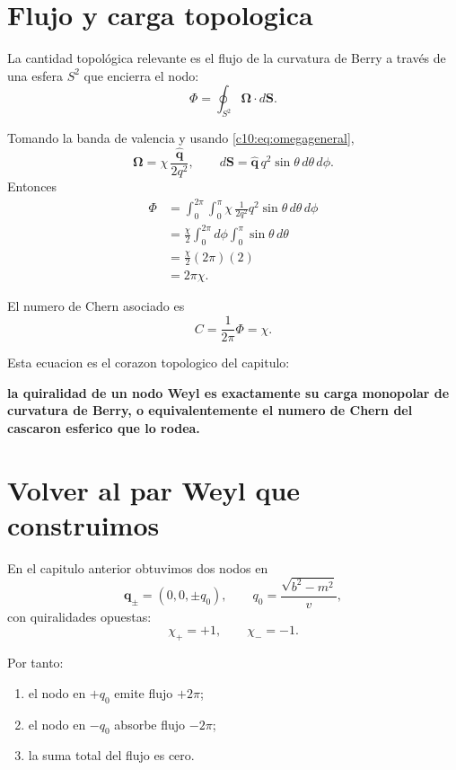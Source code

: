 \section{Flujo y carga topologica}
La cantidad topológica relevante es el flujo de la curvatura de Berry a través de una esfera \(S^2\) que encierra el nodo:
\begin{equation}
\Phi = \oint_{S^2} \bm{\Omega}\cdot d\bm{S}.
\label{c10:eq:flux}
\end{equation}

Tomando la banda de valencia y usando \eqref{c10:eq:omegageneral},
\begin{equation}
\bm{\Omega}=
\chi\,\frac{\hat{\bm{q}}}{2q^2},
\qquad
d\bm{S}= \hat{\bm{q}}\, q^2\sin\theta\, d\theta\, d\phi.
\end{equation}
Entonces
\begin{align}
\Phi
&=
\int_0^{2\pi}\int_0^\pi
\chi\,\frac{1}{2q^2}
q^2\sin\theta\, d\theta\, d\phi
\\
&=
\frac{\chi}{2}
\int_0^{2\pi}d\phi
\int_0^\pi \sin\theta\, d\theta
\\
&=
\frac{\chi}{2}(2\pi)(2)
\\
&=
2\pi \chi.
\label{c10:eq:fluxresult}
\end{align}

El numero de Chern asociado es
\begin{equation}
C = \frac{1}{2\pi}\Phi = \chi.
\label{c10:eq:chern}
\end{equation}

Esta ecuacion es el corazon topologico del capitulo:
\begin{displayquote}
\textbf{la quiralidad de un nodo Weyl es exactamente su carga monopolar de curvatura de Berry, o equivalentemente el numero de Chern del cascaron esferico que lo rodea.}
\end{displayquote}

\section{Volver al par Weyl que construimos}
En el capitulo anterior obtuvimos dos nodos en
\begin{equation}
\bm{q}_\pm = (0,0,\pm q_0),
\qquad
q_0=\frac{\sqrt{b^2-m^2}}{v},
\end{equation}
con quiralidades opuestas:
\begin{equation}
\chi_+=+1,
\qquad
\chi_-=-1.
\end{equation}

Por tanto:
\begin{enumerate}[label=\arabic*.]
    \item el nodo en \(+q_0\) emite flujo \(+2\pi\);
    \item el nodo en \(-q_0\) absorbe flujo \(-2\pi\);
    \item la suma total del flujo es cero.
\end{enumerate}

